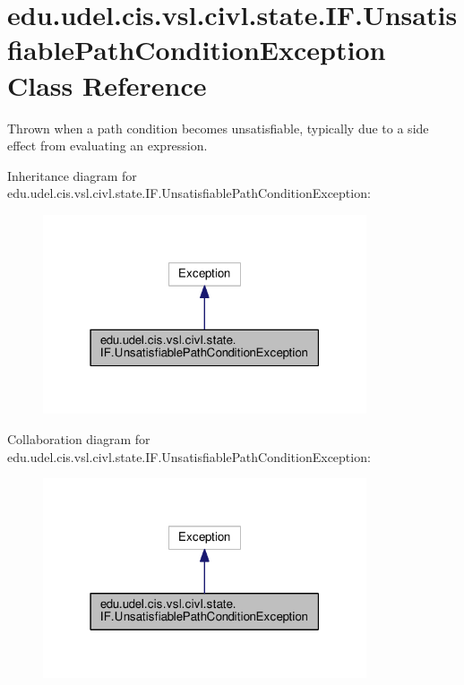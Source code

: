 \hypertarget{classedu_1_1udel_1_1cis_1_1vsl_1_1civl_1_1state_1_1IF_1_1UnsatisfiablePathConditionException}{}\section{edu.\+udel.\+cis.\+vsl.\+civl.\+state.\+I\+F.\+Unsatisfiable\+Path\+Condition\+Exception Class Reference}
\label{classedu_1_1udel_1_1cis_1_1vsl_1_1civl_1_1state_1_1IF_1_1UnsatisfiablePathConditionException}


Thrown when a path condition becomes unsatisfiable, typically due to a side effect from evaluating an expression.  




Inheritance diagram for edu.\+udel.\+cis.\+vsl.\+civl.\+state.\+I\+F.\+Unsatisfiable\+Path\+Condition\+Exception\+:
\nopagebreak
\begin{figure}[H]
\begin{center}
\leavevmode
\includegraphics[width=271pt]{classedu_1_1udel_1_1cis_1_1vsl_1_1civl_1_1state_1_1IF_1_1UnsatisfiablePathConditionException__inherit__graph}
\end{center}
\end{figure}


Collaboration diagram for edu.\+udel.\+cis.\+vsl.\+civl.\+state.\+I\+F.\+Unsatisfiable\+Path\+Condition\+Exception\+:
\nopagebreak
\begin{figure}[H]
\begin{center}
\leavevmode
\includegraphics[width=271pt]{classedu_1_1udel_1_1cis_1_1vsl_1_1civl_1_1state_1_1IF_1_1UnsatisfiablePathConditionException__coll__graph}
\end{center}
\end{figure}


